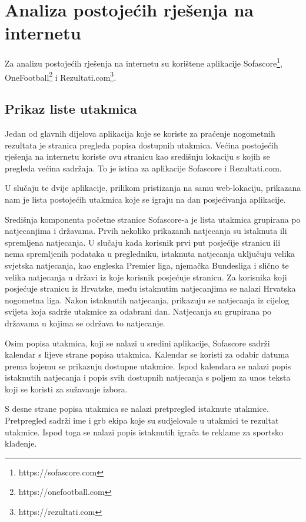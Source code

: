 \documentclass[times, utf8, zavrsni]{fer}
\begin{document}
\chapter{Analiza postojećih rješenja na internetu}
Za analizu postojećih rješenja na internetu su korištene aplikacije Sofascore\footnote{https://sofascore.com}, OneFootball\footnote{https://onefootball.com} i Rezultati.com\footnote{https://rezultati.com}.

\section{Prikaz liste utakmica}

Jedan od glavnih dijelova aplikacija koje se koriste za praćenje nogometnih rezultata je stranica pregleda popisa dostupnih utakmica.
Većina postojećih rješenja na internetu koriste ovu stranicu kao središnju lokaciju s kojih se pregleda većina sadržaja. To je istina za aplikacije Sofascore i Rezultati.com.

U slučaju te dvije aplikacije, prilikom pristizanja na samu web-lokaciju, prikazana nam je lista postojećih utakmica koje se igraju na dan posjećivanja aplikacije.

Središnja komponenta početne stranice Sofascore-a je lista utakmica grupirana po natjecanjima i državama. Prvih nekoliko prikazanih natjecanja su istaknuta ili spremljena natjecanja.
U slučaju kada korisnik prvi put posjećije stranicu ili nema spremljenih podataka u pregledniku, istaknuta natjecanja uključuju velika svjetska natjecanja,
kao engleska Premier liga, njemačka Bundesliga i slično te velika natjecanja u državi iz koje korisnik posjećuje stranicu.
Za korisnika koji posjećuje stranicu iz Hrvatske, među istaknutim natjecanjima se nalazi Hrvatska nogometna liga.
Nakon istaknutih natjecanja, prikazuju se natjecanja iz cijelog svijeta koja sadrže utakmice za odabrani dan. Natjecanja su grupirana po državama u kojima se održava to natjecanje.

Osim popisa utakmica, koji se nalazi u sredini aplikacije, Sofascore sadrži kalendar s lijeve strane popisa utakmica.
Kalendar se koristi za odabir datuma prema kojemu se prikazuju dostupne utakmice.
Ispod kalendara se nalazi popis istaknutih natjecanja i popis svih dostupnih natjecanja s poljem za unos teksta koji se koristi za sužavanje izbora.

S desne strane popisa utakmica se nalazi pretpregled istaknute utakmice. Pretpregled sadrži ime i grb ekipa koje su sudjelovale u utakmici te rezultat utakmice.
Ispod toga se nalazi popis istaknutih igrača te reklame za sportsko klađenje.
\end{document}
